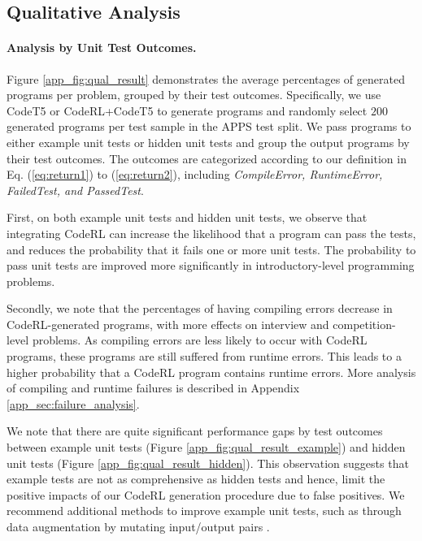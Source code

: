 \documentclass{article}
\begin{document}
\subsection{Qualitative Analysis}

\paragraph{Analysis by Unit Test Outcomes.}
Figure \ref{app_fig:qual_result} demonstrates the average percentages of generated programs per problem, grouped by their test outcomes.
Specifically, we use CodeT5 or CodeRL+CodeT5 to generate programs and randomly select $200$ generated programs per test sample in the APPS test split.
We pass programs to either example unit tests or hidden unit tests and group the output programs by their test outcomes.
The outcomes are categorized according to our definition in Eq. (\ref{eq:return1}) to (\ref{eq:return2}), including \emph{CompileError, RuntimeError, FailedTest, and PassedTest}. 

First, on both example unit tests and hidden unit tests, we observe that integrating CodeRL can increase the likelihood that a program can pass the tests, and reduces the probability that it fails one or more unit tests.
The probability to pass unit tests are improved more significantly in introductory-level programming problems. 

Secondly, we note that the percentages of having compiling errors decrease in CodeRL-generated programs, with more effects on interview and competition-level problems. 
As compiling errors are less likely to occur with CodeRL programs, these programs are still suffered from runtime errors.
This leads to a higher probability that a CodeRL program contains runtime errors. 
More analysis of compiling and runtime failures is described in Appendix \ref{app_sec:failure_analysis}. 

We note that there are quite significant performance gaps by test outcomes between example unit tests (Figure \ref{app_fig:qual_result_example}) and hidden unit tests (Figure \ref{app_fig:qual_result_hidden}).
This observation suggests that example tests are not as comprehensive as hidden tests and hence, limit the positive impacts of our CodeRL generation procedure due to false positives. 
We recommend additional methods to improve example unit tests, such as through data augmentation by mutating input/output pairs \citep{austin2021program}.
\end{document}
